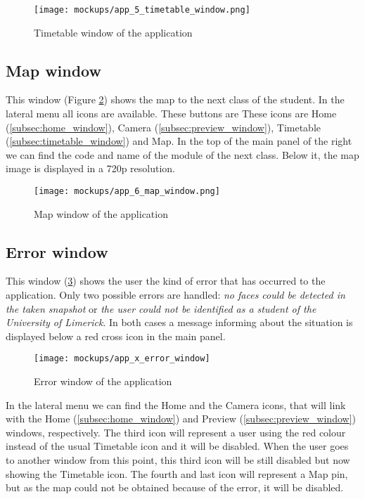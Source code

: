 	\begin{figure}[!ht]
		\centering
		\texttt{[image: mockups/app\_5\_timetable\_window.png]}
		\caption{Timetable window of the application}
		\label{fig:timetable_window}
	\end{figure}

	\subsection{Map window}
	\label{subsec:map_window}
	This window (Figure \ref{fig:map_window}) shows the map to the next class of the student. In the lateral menu all icons are available. These buttons are These icons are Home (\ref{subsec:home_window}), Camera (\ref{subsec:preview_window}), Timetable (\ref{subsec:timetable_window}) and Map. In the top of the main panel of the right we can find the code and name of the module of the next class. Below it, the map image is displayed in a \gls{720p} resolution.

	\begin{figure}[!ht]
		\centering
		\texttt{[image: mockups/app\_6\_map\_window.png]}
		\caption{Map window of the application}
		\label{fig:map_window}
	\end{figure}

	\subsection{Error window}
	\label{subsec:error_window}
	This window (\ref{fig:error_window}) shows the user the kind of error that has occurred to the application. Only two possible errors are handled: \textit{no faces could be detected in the taken snapshot} or \textit{the user could not be identified as a student of the University of Limerick}. In both cases a message informing about the situation is displayed below a red cross icon in the main panel. 

	\begin{figure}[!ht]
		\centering
		\texttt{[image: mockups/app\_x\_error\_window]}
		\caption{Error window of the application}
		\label{fig:error_window}
	\end{figure}	

	In the lateral menu we can find the Home and the Camera icons, that will link with the Home (\ref{subsec:home_window}) and Preview (\ref{subsec:preview_window}) windows, respectively. The third icon will represent a user using the red colour instead of the usual Timetable icon and it will be disabled. When the user goes to another window from this point, this third icon will be still disabled but now showing the Timetable icon. The fourth and last icon will represent a Map pin, but as the map could not be obtained because of the error, it will be disabled.

